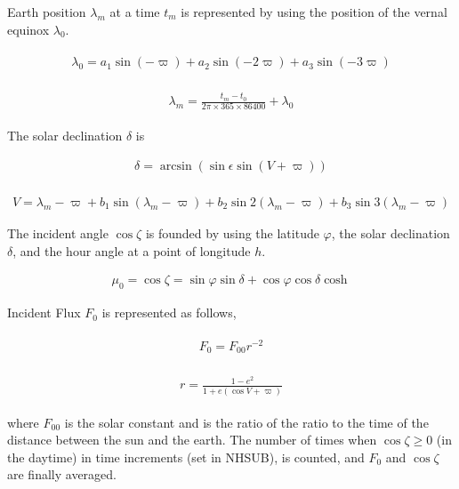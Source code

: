 Earth position \(\lambda_{m}\) at a time \(t_m\) is represented by using
the position of the vernal equinox \(\lambda_{0}\).

\begin{eqnarray}
\begin{array}{c}
\lambda_{0}=a_{1} \sin (-\varpi)+a_{2} \sin (-2 \varpi)+a_{3} \sin (-3 \varpi)
\end{array}
\end{eqnarray}

\begin{eqnarray}
\begin{array}{c}
\lambda_{m}=\frac{t_{m}-t_{0}}{2 \pi \times 365 \times 86400}+\lambda_{0}
\end{array}
\end{eqnarray}

The solar declination \(\delta\) is

\begin{eqnarray}
\delta=\arcsin (\sin \epsilon \sin (V+\varpi))
\end{eqnarray}

\begin{eqnarray}
\\V=\lambda_{m}-\varpi+b_{1} \sin \left(\lambda_{m}-\varpi\right)+b_{2} \sin 2\left(\lambda_{m}-\varpi\right)+b_{3} \sin 3\left(\lambda_{m}-\varpi\right)
\end{eqnarray}

The incident angle \(\cos \zeta\) is founded by using the latitude
\(\varphi\), the solar declination \(\delta\), and the hour angle at a
point of longitude \(h\).

\begin{eqnarray}
\mu_{0}=\cos \zeta=\sin \varphi \sin \delta+\cos \varphi \cos \delta \cosh
\end{eqnarray}

Incident Flux \(F_0\) is represented as follows,

\begin{eqnarray}
\begin{array}{c}
F_{0}=F_{00} r^{-2}
\end{array}
\end{eqnarray}

\begin{eqnarray}
\begin{array}{c}
r=\frac{1-e^{2}}{1+e(\cos V+\varpi)}
\end{array}
\end{eqnarray}

where \(F_{00}\) is the solar constant and is the ratio of the ratio to
the time of the distance between the sun and the earth. The number of
times when \(\cos \zeta \geq 0\) (in the daytime) in time increments
(set in NHSUB), is counted, and \(F_{0}\) and \(\cos \zeta\) are finally
averaged.

